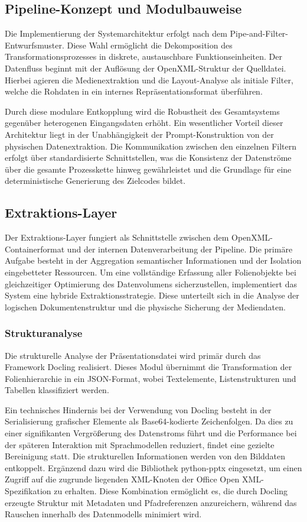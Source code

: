 \documentclass[a4paper]{article}
\begin{document}
\subsection{Pipeline-Konzept und Modulbauweise} 
Die Implementierung der Systemarchitektur erfolgt nach dem Pipe-and-Filter-Entwurfsmuster. Diese Wahl ermöglicht die Dekomposition des Transformationsprozesses in diskrete, austauschbare Funktionseinheiten. Der Datenfluss beginnt mit der Auflösung der OpenXML-Struktur der Quelldatei. Hierbei agieren die Medienextraktion und die Layout-Analyse als initiale Filter, welche die Rohdaten in ein internes Repräsentationsformat überführen.

Durch diese modulare Entkopplung wird die Robustheit des Gesamtsystems gegenüber heterogenen Eingangsdaten erhöht. Ein wesentlicher Vorteil dieser Architektur liegt in der Unabhängigkeit der Prompt-Konstruktion von der physischen Datenextraktion. Die Kommunikation zwischen den einzelnen Filtern erfolgt über standardisierte Schnittstellen, was die Konsistenz der Datenströme über die gesamte Prozesskette hinweg gewährleistet und die Grundlage für eine deterministische Generierung des Zielcodes bildet.
\subsection{Extraktions-Layer}

Der Extraktions-Layer fungiert als Schnittstelle zwischen dem OpenXML-Containerformat und der internen Datenverarbeitung der Pipeline. Die primäre Aufgabe besteht in der Aggregation semantischer Informationen und der Isolation eingebetteter Ressourcen. Um eine vollständige Erfassung aller Folienobjekte bei gleichzeitiger Optimierung des Datenvolumens sicherzustellen, implementiert das System eine hybride Extraktionsstrategie. Diese unterteilt sich in die Analyse der logischen Dokumentenstruktur und die physische Sicherung der Mediendaten.

\subsubsection{Strukturanalyse}

Die strukturelle Analyse der Präsentationsdatei wird primär durch das Framework Docling realisiert. Dieses Modul übernimmt die Transformation der Folienhierarchie in ein JSON-Format, wobei Textelemente, Listenstrukturen und Tabellen klassifiziert werden.

Ein technisches Hindernis bei der Verwendung von Docling besteht in der Serialisierung grafischer Elemente als Base64-kodierte Zeichenfolgen. Da dies zu einer signifikanten Vergrößerung des Datenstroms führt und die Performance bei der späteren Interaktion mit Sprachmodellen reduziert, findet eine gezielte Bereinigung statt. Die strukturellen Informationen werden von den Bilddaten entkoppelt. Ergänzend dazu wird die Bibliothek python-pptx eingesetzt, um einen Zugriff auf die zugrunde liegenden XML-Knoten der Office Open XML-Spezifikation zu erhalten. Diese Kombination ermöglicht es, die durch Docling erzeugte Struktur mit Metadaten und Pfadreferenzen anzureichern, während das Rauschen innerhalb des Datenmodells minimiert wird.
\end{document}
